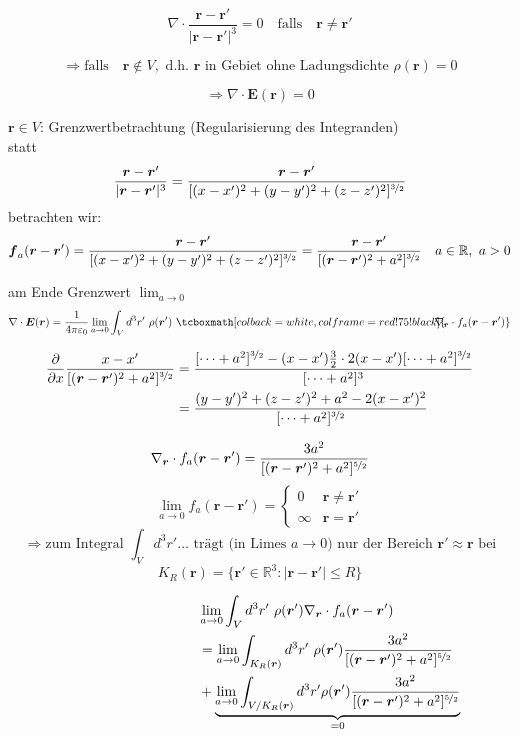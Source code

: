 \documentclass[titlepage,11pt,a4paper,ngerman]{report}
\newcommand{\prt}[2]{\frac{\partial #1}{\partial #2}}
\newcommand{\kq}{\frac{1}{4\pi\epsilon_0}}
\renewcommand{\vec}[1]{\boldsymbol{#1}}
\renewcommand{\epsilon}{\varepsilon}
\newcommand{\rmbox}[1]{\tcboxmath[colback=white,colframe=red!75!black]{#1}}
\begin{document}
$$\nabla \cdot \frac{\vec{r} - \vec{r}'}{|\vec{r} - \vec{r}'|^3} = 0 \quad \textrm{falls} \quad \vec{r} \neq \vec{r}'$$

$$\Rightarrow \textrm{falls} \quad \vec{r} \notin V, \textrm{ d.h. } \vec{r} \textrm{ in Gebiet ohne Ladungsdichte } \rho(\vec{r}) = 0$$

$$\Rightarrow \nabla \cdot \vec{E}(\vec{r}) = 0$$ 







$\vec{r} \in V$: Grenzwertbetrachtung (Regularisierung des Integranden)\\
statt
$$\frac{\vec{r} - \vec{r}'}{|\vec{r} - \vec{r}'|^3} = \frac{\vec{r}-\vec{r}'}{[(x-x')^2 + (y-y')^2 + (z-z')^2]^{\nicefrac{3}{2}}}$$
betrachten wir:
$$\vec{f}_a (\vec{r}-\vec{r}') = \frac{\vec{r}-\vec{r}'}{[(x-x')^2 + (y-y')^2 + (z-z')^2]^{\nicefrac{3}{2}}} = \frac{\vec{r}-\vec{r}'}{[(\vec{r}-\vec{r}')^2 + a^2]^{\nicefrac{3}{2}}} \quad a \in \mathbb R,\ a>0$$

am Ende Grenzwert $\displaystyle{\lim_{a \to 0}}$
$$\nabla \cdot \vec{E} (\vec{r}) = \kq \lim_{a \to 0} \int_V d^3r'\ \rho(\vec{r}')\ \rmbox{\hspace{-10pt}\nabla_{\vec{r}}\cdot f_a(\vec{r}-\vec{r}')}$$

\begin{align*}
\prt{}{x} \frac{x-x'}{[(\vec{r}-\vec{r}')^2 + a^2]^{\nicefrac{3}{2}}} &= \frac{[\dots +a^2]^{\nicefrac{3}{2}} - (x - x') \frac{3}{2} \cdot 2(x-x') [\dots + a^2]^{\nicefrac{3}{2}}}{[\dots + a^2]^3}\\
&= \frac{(y - y')^2 + (z - z')^2 + a^2 - 2(x - x')^2}{[\dots + a^2]^{\nicefrac{3}{2}}}
\end{align*}

$$\nabla_{\vec{r}} \cdot f_a(\vec{r}-\vec{r}') = \frac{3a^2}{[(\vec{r}-\vec{r}')^2 + a^2]^{\nicefrac{5}{2}}}$$
$$\lim_{a \to 0} f_a(\vec{r}-\vec{r}') = \left\{ \begin{array}{cc}
0 & \vec{r} \neq \vec{r}'\\
\infty & \vec{r} = \vec{r}'	
\end{array} \right.$$
$$\Rightarrow \textrm{zum Integral } \int_V d^3r' \dots \textrm{ trägt (in Limes }a \to 0) \textrm{ nur der Bereich } \vec{r}' \approx \vec{r} \textrm{ bei}$$
$$K_R (\vec{r}) = \{\vec{r}' \in \mathbb R^3: |\vec{r} - \vec{r}'| \leq R\}$$






\begin{align*}
 	\hspace{100pt} &\lim_{a \to 0} \int_V d^3 r'\ \rho(\vec{r}') \nabla_{\vec{r}} \cdot f_a(\vec{r}- \vec{r}')\\
	&= \lim_{a \to 0} \int_{K_R (\vec{r})} d^3 r' \ \rho(\vec{r}') \frac{3a^2}{[(\vec{r}-\vec{r}')^2 + a^2]^{\nicefrac{5}{2}}}\\
 	&+ \underbrace{\lim_{a \to 0} \int_{V / K_R (\vec{r})} d^3 r' \rho(\vec{r}') \frac{3a^2}{[(\vec{r}-\vec{r}')^2 + a^2]^{\nicefrac{5}{2}}}}_{= 0}
\end{align*}
\end{document}
